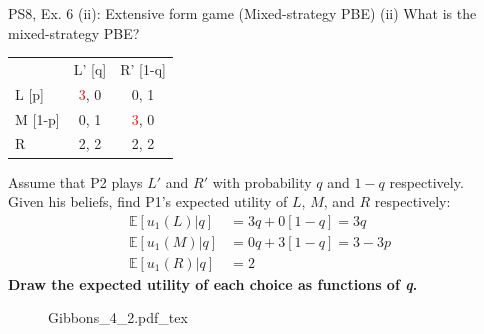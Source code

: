 \begin{frame}{PS8, Ex. 6 (ii): Extensive form game (Mixed-strategy PBE)}
    (ii) What is the mixed-strategy PBE? \vspace{-8pt}
    \begin{multicols}{2}
      \begin{table}
        \begin{tabular}{l|c|c|}
          \multicolumn{1}{c}{} & \multicolumn{1}{c}{L' [q]} & \multicolumn{1}{c}{R' [1-q]} \\\cline{2-3}
          L [p]   & \textcolor{red}{3}, 0 & 0, \color{blue}1 \\\cline{2-3}
          M [1-p] & 0, \color{blue}1 & \textcolor{red}{3}, 0 \\\cline{2-3}
          R       & 2, \color{blue}2 & 2, \color{blue}2 \\\cline{2-3}
        \end{tabular}
      \end{table} \vspace{-4pt}
      Assume that P2 plays $L'$ and $R'$ with probability $q$ and $1-q$ respectively.\\\smallskip
      Given his beliefs, find P1's expected utility of $L$, $M$, and $R$ respectively: \vspace{-4pt}
      \begin{align*}
        \mathbb{E}[u_1(L)|q]&=3q+0[1-q]=3q\\
        \mathbb{E}[u_1(M)|q]&=0q+3[1-q]=3-3p\\
        \mathbb{E}[u_1(R)|q]&=2
      \end{align*}
      \textbf{Draw the expected utility of each choice as functions of \textit{q}.}
      \vfill\null\columnbreak
      \begin{figure}[!h]
        \center {}
        {Gibbons_4_2.pdf_tex}
      \end{figure}
      \vfill\null
    \end{multicols}
\end{frame}
